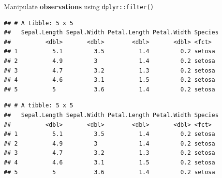 \documentclass[14pt,ignorenonframetext,]{bredelebeamer}
\newenvironment{Shaded}{\begin{snugshade}}{\end{snugshade}}
\newcommand{\KeywordTok}[1]{\textcolor[rgb]{0.94,0.87,0.69}{#1}}
\newcommand{\DecValTok}[1]{\textcolor[rgb]{0.86,0.86,0.80}{#1}}
\newcommand{\StringTok}[1]{\textcolor[rgb]{0.80,0.58,0.58}{#1}}
\newcommand{\OperatorTok}[1]{\textcolor[rgb]{0.94,0.94,0.82}{#1}}
\newcommand{\NormalTok}[1]{\textcolor[rgb]{0.80,0.80,0.80}{#1}}
\begin{document}
\begin{frame}[fragile]{Manipulate \textbf{observations} using
\texttt{dplyr::filter()}}

\begin{Shaded}
\end{Shaded}

\begin{verbatim}
## # A tibble: 5 x 5
##   Sepal.Length Sepal.Width Petal.Length Petal.Width Species
##          <dbl>       <dbl>        <dbl>       <dbl> <fct>  
## 1          5.1         3.5          1.4         0.2 setosa 
## 2          4.9         3            1.4         0.2 setosa 
## 3          4.7         3.2          1.3         0.2 setosa 
## 4          4.6         3.1          1.5         0.2 setosa 
## 5          5           3.6          1.4         0.2 setosa
\end{verbatim}

\begin{Shaded}
\end{Shaded}

\begin{verbatim}
## # A tibble: 5 x 5
##   Sepal.Length Sepal.Width Petal.Length Petal.Width Species
##          <dbl>       <dbl>        <dbl>       <dbl> <fct>  
## 1          5.1         3.5          1.4         0.2 setosa 
## 2          4.9         3            1.4         0.2 setosa 
## 3          4.7         3.2          1.3         0.2 setosa 
## 4          4.6         3.1          1.5         0.2 setosa 
## 5          5           3.6          1.4         0.2 setosa
\end{verbatim}

\end{frame}
\end{document}

